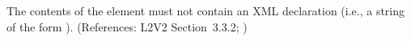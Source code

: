 The contents of the  element must not contain an XML
declaration (i.e., a string of the form ).  (References: L2V2 Section~3.3.2;
)
